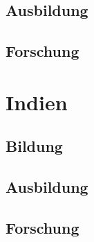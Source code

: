 \subsection{Ausbildung}
\subsection{Forschung}

\section{Indien}
\subsection{Bildung}
\subsection{Ausbildung}
\subsection{Forschung}







